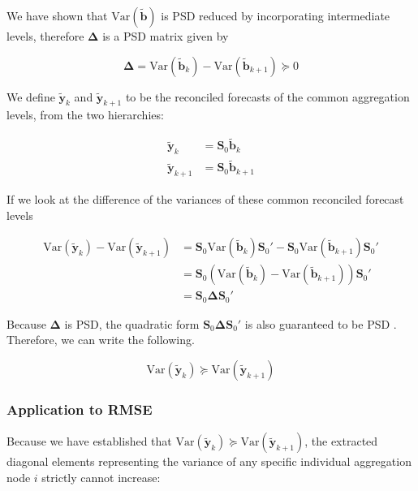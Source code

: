 \documentclass[sn-basic,Numbered,iicol]{sn-jnl}
\theoremstyle{thmstyleone}%
\theoremstyle{thmstyletwo}%
\theoremstyle{thmstylethree}%
\begin{document}
We have shown that $\text{Var}(\tilde{\mathbf{b}})$ is PSD reduced by incorporating intermediate levels, therefore $\mathbf{\Delta}$ is a PSD matrix given by

\begin{equation}
\mathbf{\Delta} = \text{Var}(\tilde{\mathbf{b}}_k) - \text{Var}(\tilde{\mathbf{b}}_{k+1}) \succeq 0
\end{equation}

We define $\tilde{\mathbf{y}}_k$ and $\tilde{\mathbf{y}}_{k+1}$ to be the reconciled forecasts of the common aggregation levels, from the two hierarchies:

\begin{align}
\tilde{\mathbf{y}}_k &= \mathbf{S}_0 \tilde{\mathbf{b}}_k \\
\tilde{\mathbf{y}}_{k+1} &= \mathbf{S}_0 \tilde{\mathbf{b}}_{k+1}
\end{align}

If we look at the difference of the variances of these common reconciled forecast levels

\begin{align}
\text{Var}(\tilde{\mathbf{y}}_k) - \text{Var}(\tilde{\mathbf{y}}_{k+1}) &= \mathbf{S}_0 \text{Var}(\tilde{\mathbf{b}}_k) \mathbf{S}_0' - \mathbf{S}_0 \text{Var}(\tilde{\mathbf{b}}_{k+1}) \mathbf{S}_0' \nonumber \\
&= \mathbf{S}_0 \left( \text{Var}(\tilde{\mathbf{b}}_k) - \text{Var}(\tilde{\mathbf{b}}_{k+1}) \right) \mathbf{S}_0' \nonumber \\
&= \mathbf{S}_0 \mathbf{\Delta} \mathbf{S}_0'
\end{align}

Because $\mathbf{\Delta}$ is PSD, the quadratic form $\mathbf{S}_0 \mathbf{\Delta} \mathbf{S}_0'$ is also guaranteed to be PSD \cite{sebermatrix}. Therefore, we can write the following.

\begin{equation}
\text{Var}(\tilde{\mathbf{y}}_k) \succeq \text{Var}(\tilde{\mathbf{y}}_{k+1})
\end{equation}

\subsubsection{Application to RMSE}\label{subsubsec:rmse}

Because we have established that $\text{Var}(\tilde{\mathbf{y}}_k)\succeq\text{Var}(\tilde{\mathbf{y}}_{k+1})$, the extracted diagonal elements representing the variance of any specific individual aggregation node $i$ strictly cannot increase:
\end{document}
